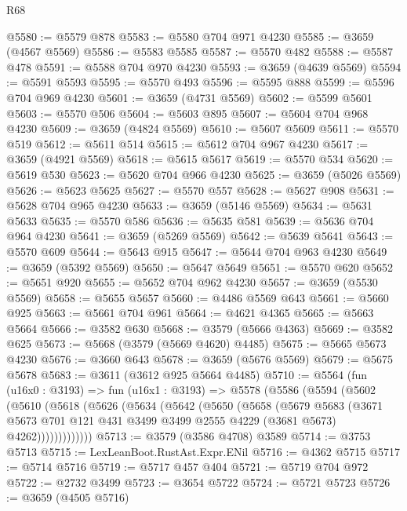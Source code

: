 \begin{lexlean}{R68}
\begin{coremodule}
@5580 := @5579 @878
@5583 := @5580 @704 @971 @4230
@5585 := @3659 (@4567 @5569)
@5586 := @5583 @5585
@5587 := @5570 @482
@5588 := @5587 @478
@5591 := @5588 @704 @970 @4230
@5593 := @3659 (@4639 @5569)
@5594 := @5591 @5593
@5595 := @5570 @493
@5596 := @5595 @888
@5599 := @5596 @704 @969 @4230
@5601 := @3659 (@4731 @5569)
@5602 := @5599 @5601
@5603 := @5570 @506
@5604 := @5603 @895
@5607 := @5604 @704 @968 @4230
@5609 := @3659 (@4824 @5569)
@5610 := @5607 @5609
@5611 := @5570 @519
@5612 := @5611 @514
@5615 := @5612 @704 @967 @4230
@5617 := @3659 (@4921 @5569)
@5618 := @5615 @5617
@5619 := @5570 @534
@5620 := @5619 @530
@5623 := @5620 @704 @966 @4230
@5625 := @3659 (@5026 @5569)
@5626 := @5623 @5625
@5627 := @5570 @557
@5628 := @5627 @908
@5631 := @5628 @704 @965 @4230
@5633 := @3659 (@5146 @5569)
@5634 := @5631 @5633
@5635 := @5570 @586
@5636 := @5635 @581
@5639 := @5636 @704 @964 @4230
@5641 := @3659 (@5269 @5569)
@5642 := @5639 @5641
@5643 := @5570 @609
@5644 := @5643 @915
@5647 := @5644 @704 @963 @4230
@5649 := @3659 (@5392 @5569)
@5650 := @5647 @5649
@5651 := @5570 @620
@5652 := @5651 @920
@5655 := @5652 @704 @962 @4230
@5657 := @3659 (@5530 @5569)
@5658 := @5655 @5657
@5660 := @4486 @5569 @643
@5661 := @5660 @925
@5663 := @5661 @704 @961
@5664 := @4621 @4365
@5665 := @5663 @5664
@5666 := @3582 @630
@5668 := @3579 (@5666 @4363)
@5669 := @3582 @625
@5673 := @5668 (@3579 (@5669 @4620) @4485)
@5675 := @5665 @5673 @4230
@5676 := @3660 @643
@5678 := @3659 (@5676 @5569)
@5679 := @5675 @5678
@5683 := @3611 (@3612 @925 @5664 @4485)
@5710 := @5564
    (fun (u16x0 : @3193) =>
    fun (u16x1 : @3193) =>
    @5578
      (@5586
        (@5594
          (@5602
            (@5610
              (@5618
                (@5626
                  (@5634
                    (@5642
                      (@5650
                        (@5658
                          (@5679
                            @5683
                            (@3671
                              @5673
                              @701
                              @121
                              @431
                              @3499
                              @3499
                              @2555
                              @4229
                              (@3681 @5673)
                              @4262)))))))))))))
@5713 := @3579 (@3586 @4708) @3589
@5714 := @3753 @5713
@5715 := LexLeanBoot.RustAst.Expr.ENil
@5716 := @4362 @5715
@5717 := @5714 @5716
@5719 := @5717 @457 @404
@5721 := @5719 @704 @972
@5722 := @2732 @3499
@5723 := @3654 @5722
@5724 := @5721 @5723
@5726 := @3659 (@4505 @5716)

\end{coremodule}
\end{lexlean}
